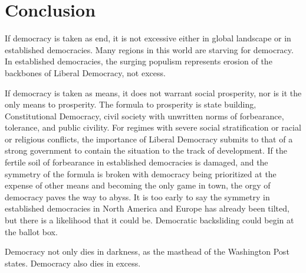 \documentclass{scrartcl}
\theoremstyle{definition}
\begin{document}
\section{Conclusion}

If democracy is taken as end, it is not excessive either in global landscape or in established democracies. Many regions in this world are starving for democracy. In established democracies, the surging populism represents erosion of the backbones of Liberal Democracy, not excess. 

If democracy is taken as means, it does not warrant social prosperity, nor is it the only means to prosperity. The formula to prosperity is state building, Constitutional Democracy, civil society with unwritten norms of forbearance, tolerance, and public civility. For regimes with severe social stratification or racial or religious conflicts, the importance of Liberal Democracy submits to that of a strong government to contain the situation to the track of development. If the fertile soil of forbearance in established democracies is damaged, and the symmetry of the formula is broken with democracy being prioritized at the expense of other means and becoming the only game in town, the orgy of democracy paves the way to abyss. It is too early to say the symmetry in established democracies in North America and Europe has already been tilted, but there is a likelihood that it could be. Democratic backsliding could begin at the ballot box. 

Democracy not only dies in darkness, as the masthead of the Washington Post states. Democracy also dies in excess. 

\printbibliography
\end{document}
